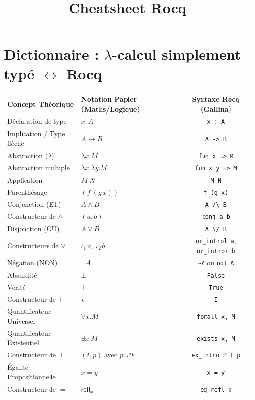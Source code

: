 \documentclass[11pt,a4paper]{article}
\title{\vspace{-2cm}\textbf{Cheatsheet Rocq}}
\date{}
\begin{document}
\maketitle
\vspace{-1.5cm}

\section{Dictionnaire : $\lambda$-calcul simplement typé $\leftrightarrow$ Rocq}

\renewcommand{\arraystretch}{1.5}
\begin{tabularx}{\textwidth}{@{} l X c @{}}
  \toprule
  \textbf{Concept Théorique} & \textbf{Notation Papier (Maths/Logique)} & \textbf{Syntaxe Rocq (Gallina)} \\
  \midrule
  Déclaration de type & $x : A$ & \texttt{x : A} \\
  Implication / Type flèche & $A \to B$ & \texttt{A -> B} \\
  Abstraction ($\lambda$) & $\lambda x. M$ & \texttt{fun x => M} \\
  Abstraction multiple & $\lambda x. \lambda y. M$ & \texttt{fun x y => M} \\
  Application & $M \ N$ & \texttt{M N} \\
  Parenthésage & $(f \ (g \ x))$ & \texttt{f (g x)} \\
  \midrule
  Conjonction (ET) & $A \land B$ & \texttt{A /\textbackslash\ B} \\
  Constructeur de $\land$ & $(a, b)$ & \texttt{conj a b} \\
  Disjonction (OU) & $A \lor B$ & \texttt{A \textbackslash/ B} \\
  Constructeurs de $\lor$ & $\iota_1\, a,\ \iota_2\, b$ & \texttt{or\_introl a}, \texttt{or\_intror b} \\
  Négation (NON) & $\neg A$ & \texttt{\textasciitilde A} ou \texttt{not A} \\
  Absurdité & $\bot$ & \texttt{False} \\
  Vérité & $\top$ & \texttt{True} \\
  Constructeur de $\top$ & $\star$ & \texttt{I} \\
  \midrule
  Quantificateur Universel & $\forall x. M$ & \texttt{forall x, M} \\
  Quantificateur Existentiel & $\exists x. M$ & \texttt{exists x, M} \\
  Constructeur de $\exists$ & $(t, p)$ avec $p : P\,t$ & \texttt{ex\_intro P t p} \\
  Égalité Propositionnelle & $x = y$ & \texttt{x = y} \\
  Constructeur de $=$ & $\mathsf{refl}_x$ & \texttt{eq\_refl x} \\
  \bottomrule
\end{tabularx}
\end{document}

